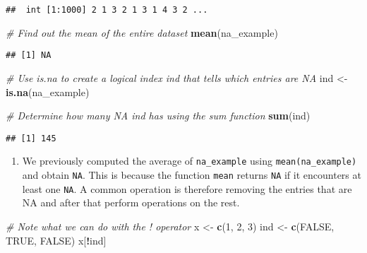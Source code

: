 \documentclass[]{article}
\newenvironment{Shaded}{\begin{snugshade}}{\end{snugshade}}
\newcommand{\CommentTok}[1]{\textcolor[rgb]{0.56,0.35,0.01}{\textit{#1}}}
\newcommand{\DecValTok}[1]{\textcolor[rgb]{0.00,0.00,0.81}{#1}}
\newcommand{\KeywordTok}[1]{\textcolor[rgb]{0.13,0.29,0.53}{\textbf{#1}}}
\newcommand{\NormalTok}[1]{#1}
\newcommand{\OperatorTok}[1]{\textcolor[rgb]{0.81,0.36,0.00}{\textbf{#1}}}
\newcommand{\OtherTok}[1]{\textcolor[rgb]{0.56,0.35,0.01}{#1}}
\newcommand{\StringTok}[1]{\textcolor[rgb]{0.31,0.60,0.02}{#1}}
\providecommand{\tightlist}{%
  \setlength{\itemsep}{0pt}\setlength{\parskip}{0pt}}
\begin{document}
\begin{verbatim}
##  int [1:1000] 2 1 3 2 1 3 1 4 3 2 ...
\end{verbatim}

\begin{Shaded}
\begin{Highlighting}[]
\CommentTok{# Find out the mean of the entire dataset }
\KeywordTok{mean}\NormalTok{(na_example)}
\end{Highlighting}
\end{Shaded}

\begin{verbatim}
## [1] NA
\end{verbatim}

\begin{Shaded}
\begin{Highlighting}[]
\CommentTok{# Use is.na to create a logical index ind that tells which entries are NA}
\NormalTok{ind <-}\StringTok{ }\KeywordTok{is.na}\NormalTok{(na_example)}

\CommentTok{# Determine how many NA ind has using the sum function}
\KeywordTok{sum}\NormalTok{(ind)}
\end{Highlighting}
\end{Shaded}

\begin{verbatim}
## [1] 145
\end{verbatim}

\begin{enumerate}
\def\labelenumi{\arabic{enumi}.}
\setcounter{enumi}{7}
\tightlist
\item
  We previously computed the average of \texttt{na\_example} using
  \texttt{mean(na\_example)} and obtain \texttt{NA}. This is because the
  function \texttt{mean} returns \texttt{NA} if it encounters at least
  one \texttt{NA}. A common operation is therefore removing the entries
  that are NA and after that perform operations on the rest.
\end{enumerate}

\begin{Shaded}
\begin{Highlighting}[]
\CommentTok{# Note what we can do with the ! operator}
\NormalTok{x <-}\StringTok{ }\KeywordTok{c}\NormalTok{(}\DecValTok{1}\NormalTok{, }\DecValTok{2}\NormalTok{, }\DecValTok{3}\NormalTok{)}
\NormalTok{ind <-}\StringTok{ }\KeywordTok{c}\NormalTok{(}\OtherTok{FALSE}\NormalTok{, }\OtherTok{TRUE}\NormalTok{, }\OtherTok{FALSE}\NormalTok{)}
\NormalTok{x[}\OperatorTok{!}\NormalTok{ind]}
\end{Highlighting}
\end{Shaded}
\end{document}

